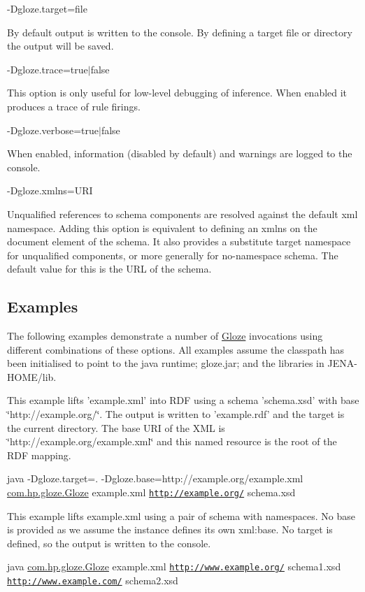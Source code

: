 {\ttfamily -\/Dgloze.target=file}

By default output is written to the console. By defining a target file or directory the output will be saved.

{\ttfamily -\/Dgloze.trace=true$|$false}

This option is only useful for low-\/level debugging of inference. When enabled it produces a trace of rule firings.

{\ttfamily -\/Dgloze.verbose=true$|$false}

When enabled, information (disabled by default) and warnings are logged to the console.

{\ttfamily -\/Dgloze.xmlns=URI}

Unqualified references to schema components are resolved against the default xml namespace. Adding this option is equivalent to defining an xmlns on the document element of the schema. It also provides a substitute target namespace for unqualified components, or more generally for no-\/namespace schema. The default value for this is the URL of the schema.\hypertarget{gettingstarted_examples}{}\subsection{Examples}\label{gettingstarted_examples}
The following examples demonstrate a number of \hyperlink{classcom_1_1hp_1_1gloze_1_1_gloze}{Gloze} invocations using different combinations of these options. All examples assume the classpath has been initialised to point to the java runtime; gloze.jar; and the libraries in JENA-\/HOME/lib.

This example lifts 'example.xml' into RDF using a schema 'schema.xsd' with base \char`\"{}http://example.org/\char`\"{}. The output is written to 'example.rdf' and the target is the current directory. The base URI of the XML is \char`\"{}http://example.org/example.xml\char`\"{} and this named resource is the root of the RDF mapping.

{\ttfamily java -\/Dgloze.target=. -\/Dgloze.base=http://example.org/example.xml \hyperlink{classcom_1_1hp_1_1gloze_1_1_gloze}{com.hp.gloze.Gloze} example.xml \href{http://example.org/}{\tt http://example.org/} schema.xsd}

This example lifts example.xml using a pair of schema with namespaces. No base is provided as we assume the instance defines its own xml:base. No target is defined, so the output is written to the console.

{\ttfamily java \hyperlink{classcom_1_1hp_1_1gloze_1_1_gloze}{com.hp.gloze.Gloze} example.xml \href{http://www.example.org/}{\tt http://www.example.org/} schema1.xsd \href{http://www.example.com/}{\tt http://www.example.com/} schema2.xsd}

